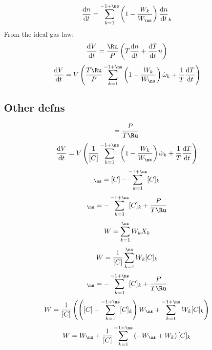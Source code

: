 \documentclass[a4paper,10pt]{article}
\begin{document}
\begin{dmath} \frac{\text{d} n }{\text{d} t } = \sum_{k=1}^{-1 + \ns} \left(1 - \frac{W_{k}}{W_{\ns}}\right) \frac{\text{d} n }{\text{d} t }_{k}\end{dmath} 
From the ideal gas law:
\begin{dmath} \frac{\text{d} V }{\text{d} t } = \frac{\Ru}{P} \left(T \frac{\text{d} n }{\text{d} t } + \frac{\text{d} T }{\text{d} t } n\right)\end{dmath} 
\begin{dmath} \frac{\text{d} V }{\text{d} t } = V \left(\frac{T \Ru}{P} \sum_{k=1}^{-1 + \ns} \left(1 - \frac{W_{k}}{W_{\ns}}\right) \dot{\omega}_{k} + \frac{1}{T} \frac{\text{d} T }{\text{d} t }\right)\end{dmath} 
\subsection{Other defns}
\begin{dmath} [C] = \frac{P}{T \Ru}\end{dmath} 
\begin{dmath} \frac{\text{d} V }{\text{d} t } = V \left(\frac{1}{[C]} \sum_{k=1}^{-1 + \ns} \left(1 - \frac{W_{k}}{W_{\ns}}\right) \dot{\omega}_{k} + \frac{1}{T} \frac{\text{d} T }{\text{d} t }\right)\end{dmath} 
\begin{dmath} [C]_{\ns} = [C] - \sum_{k=1}^{-1 + \ns} [C]_{k}\end{dmath} 
\begin{dmath} [C]_{\ns} = - \sum_{k=1}^{-1 + \ns} [C]_{k} + \frac{P}{T \Ru}\end{dmath} 
\begin{dmath} W = \sum_{k=1}^{\ns} W_{k} X_{k}\end{dmath} 
\begin{dmath} W = \frac{1}{[C]} \sum_{k=1}^{\ns} W_{k} [C]_{k}\end{dmath} 
\begin{dmath} [C]_{\ns} = - \sum_{k=1}^{-1 + \ns} [C]_{k} + \frac{P}{T \Ru}\end{dmath} 
\begin{dmath} W = \frac{1}{[C]} \left(\left([C] - \sum_{k=1}^{-1 + \ns} [C]_{k}\right) W_{\ns} + \sum_{k=1}^{-1 + \ns} W_{k} [C]_{k}\right)\end{dmath} 
\begin{dmath} W = W_{\ns} + \frac{1}{[C]} \sum_{k=1}^{-1 + \ns} \left(- W_{\ns} + W_{k}\right) [C]_{k}\end{dmath} 
\end{document}
